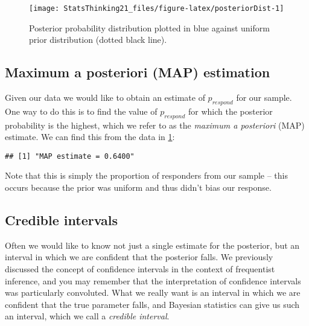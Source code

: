 \documentclass[]{book}
\newenvironment{Shaded}{\begin{snugshade}}{\end{snugshade}}
\newcommand{\KeywordTok}[1]{\textcolor[rgb]{0.13,0.29,0.53}{\textbf{#1}}}
\newcommand{\DecValTok}[1]{\textcolor[rgb]{0.00,0.00,0.81}{#1}}
\newcommand{\StringTok}[1]{\textcolor[rgb]{0.31,0.60,0.02}{#1}}
\newcommand{\CommentTok}[1]{\textcolor[rgb]{0.56,0.35,0.01}{\textit{#1}}}
\newcommand{\OperatorTok}[1]{\textcolor[rgb]{0.81,0.36,0.00}{\textbf{#1}}}
\newcommand{\NormalTok}[1]{#1}
\theoremstyle{definition}
\theoremstyle{definition}
\theoremstyle{definition}
\theoremstyle{remark}
\begin{document}
\begin{figure}
\texttt{[image: StatsThinking21\_files/figure-latex/posteriorDist-1]} \caption{Posterior probability distribution plotted in blue against uniform prior distribution (dotted black line).}\label{fig:posteriorDist}
\end{figure}

\subsection{Maximum a posteriori (MAP)
estimation}\label{maximum-a-posteriori-map-estimation}

Given our data we would like to obtain an estimate of \(p_{respond}\)
for our sample. One way to do this is to find the value of
\(p_{respond}\) for which the posterior probability is the highest,
which we refer to as the \emph{maximum a posteriori} (MAP) estimate. We
can find this from the data in \ref{fig:posteriorDist}:

\begin{Shaded}
\end{Shaded}

\begin{verbatim}
## [1] "MAP estimate = 0.6400"
\end{verbatim}

Note that this is simply the proportion of responders from our sample --
this occurs because the prior was uniform and thus didn't bias our
response.

\subsection{Credible intervals}\label{credible-intervals}

Often we would like to know not just a single estimate for the
posterior, but an interval in which we are confident that the posterior
falls. We previously discussed the concept of confidence intervals in
the context of frequentist inference, and you may remember that the
interpretation of confidence intervals was particularly convoluted. What
we really want is an interval in which we are confident that the true
parameter falls, and Bayesian statistics can give us such an interval,
which we call a \emph{credible interval}.
\end{document}
